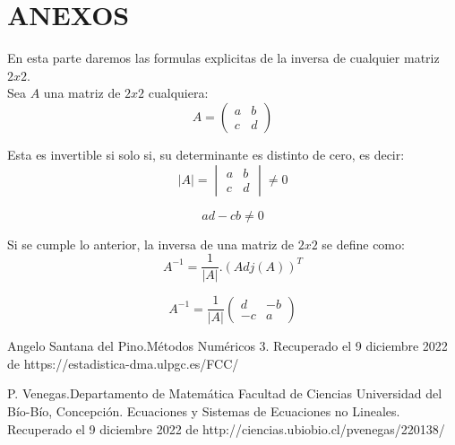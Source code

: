 \documentclass[10pt,a4paper]{article}
\begin{document}
\section{ANEXOS}
En esta parte daremos las formulas explicitas de la inversa de cualquier matriz $2x2$. \\

Sea $A$ una matriz de $2x2$ cualquiera:
$$A= \begin{pmatrix}
a &b \\ 
c &d 
\end{pmatrix}$$

Esta es invertible si solo si, su determinante es distinto de cero, es decir: 
$$\left | A \right |= 
\begin{vmatrix}
a &b \\ 
c &d 
\end{vmatrix}\neq 0$$

$$ad-cb \neq 0$$

Si se cumple lo anterior, la inversa de una matriz de $2x2$ se define como: 
$$A^{-1}=\frac{1}{\left | A \right |}.\left ( Adj(A) \right )^{T}$$

$$A^{-1}=\frac{1}{\left | A \right |}
\begin{pmatrix}
d & -b \\ 
-c & a
\end{pmatrix}$$

\begin{thebibliography}{0}
  
   Angelo Santana del Pino.Métodos Numéricos 3. Recuperado el 9 diciembre 2022 de https://estadistica-dma.ulpgc.es/FCC/
  
   P. Venegas.Departamento de Matemática
Facultad de Ciencias Universidad del Bío-Bío, Concepción. Ecuaciones y Sistemas de Ecuaciones no Lineales. Recuperado el 9 diciembre 2022 de http://ciencias.ubiobio.cl/pvenegas/220138/

    
  
\end{thebibliography}
\end{document}

